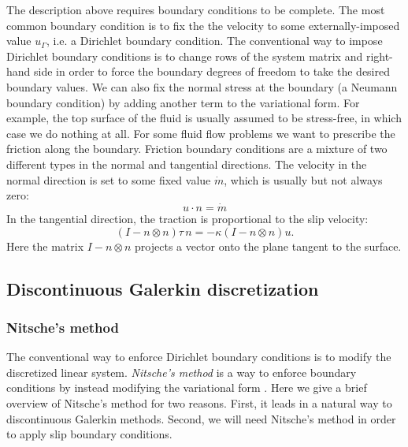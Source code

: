 \documentclass[gmd, manuscript]{copernicus}
\begin{document}
The description above requires boundary conditions to be complete.
The most common boundary condition is to fix the the velocity to some externally-imposed value $u_\Gamma$, i.e. a Dirichlet boundary condition.
The conventional way to impose Dirichlet boundary conditions is to change rows of the system matrix and right-hand side in order to force the boundary degrees of freedom to take the desired boundary values.
We can also fix the normal stress at the boundary (a Neumann boundary condition) by adding another term to the variational form.
For example, the top surface of the fluid is usually assumed to be stress-free, in which case we do nothing at all.
For some fluid flow problems we want to prescribe the friction along the boundary.
Friction boundary conditions are a mixture of two different types in the normal and tangential directions.
The velocity in the normal direction is set to some fixed value $\dot m$, which is usually but not always zero:
\begin{equation}
    u\cdot n = \dot m
    \label{eq:normal-flow-bc}
\end{equation}
In the tangential direction, the traction is proportional to the slip velocity:
\begin{equation}
    (I - n\otimes n)\tau\,n = -\kappa(I - n\otimes n)u.
\end{equation}
Here the matrix $I - n\otimes n$ projects a vector onto the plane tangent to the surface.

\subsection{Discontinuous Galerkin discretization}

\subsubsection{Nitsche's method}

The conventional way to enforce Dirichlet boundary conditions is to modify the discretized linear system.
\emph{Nitsche's method} is a way to enforce boundary conditions by instead modifying the variational form \citep{nitsche1971variationsprinzip}.
Here we give a brief overview of Nitsche's method for two reasons.
First, it leads in a natural way to discontinuous Galerkin methods.
Second, we will need Nitsche's method in order to apply slip boundary conditions.
\end{document}

